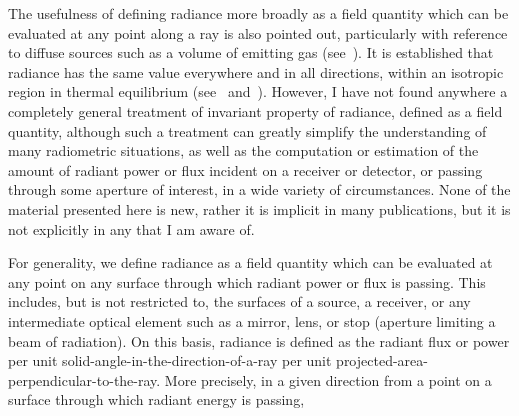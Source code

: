 \begin{refsection}
The usefulness of defining radiance more broadly as a field quantity which can
be evaluated at any point along a ray is also pointed out, particularly with
reference to diffuse sources such as a volume of emitting gas
(see~\cite{kelton1963infrared}).
It is established that radiance has the same value everywhere and in all
directions, within an isotropic region in thermal equilibrium
(see~\cite[p.~183--196]{planck57} and~\cite{richtmyer47}).
However, I have not found anywhere a completely general treatment of invariant
property of radiance, defined as a field quantity, although such a treatment can
greatly simplify the understanding of many radiometric situations, as well as
the computation or estimation of the amount of radiant power or flux incident on
a receiver or detector, or passing through some aperture of interest, in a wide
variety of circumstances. None of the material presented here is new, rather it
is implicit in many publications, but it is not explicitly in any that I am
aware of.

For generality, we define radiance as a field quantity which can be evaluated at
any point on any surface through which radiant power or flux is passing.
This includes, but is not restricted to, the surfaces of a source, a receiver,
or any intermediate optical element such as a mirror, lens, or stop (aperture
limiting a beam of radiation). On this basis, radiance is defined as the radiant
flux or power per unit solid-angle-in-the-direction-of-a-ray per unit
projected-area-perpendicular-to-the-ray.
More precisely, in a given direction from a point on a surface through which radiant
energy is passing,


\end{refsection}
